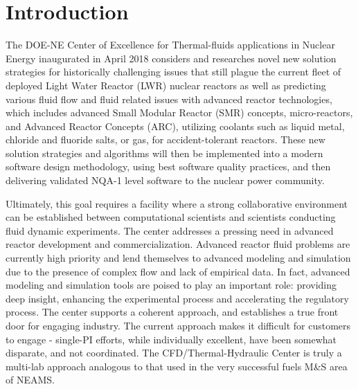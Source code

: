 \section{Introduction}
\label{s:intro}

The DOE-NE Center of Excellence for Thermal-fluids applications in Nuclear Energy inaugurated in April 2018 considers and researches novel new solution strategies for historically challenging issues that still plague the current fleet of deployed Light Water Reactor (LWR) nuclear reactors as well as predicting various fluid flow and fluid related issues with advanced reactor technologies, which includes advanced Small Modular Reactor (SMR) concepts, micro-reactors, and Advanced Reactor Concepts (ARC), utilizing coolants such as liquid metal, chloride and  fluoride salts, or gas, for accident-tolerant reactors. These new solution strategies and algorithms will then be implemented into a modern software design methodology, using best software quality practices, and then delivering validated NQA-1 level software to the nuclear power community.

Ultimately, this goal requires a facility where a strong collaborative environment can be established between computational scientists and scientists conducting fluid dynamic experiments. The center addresses a pressing need in advanced reactor development and commercialization. Advanced reactor fluid problems are currently high priority and lend themselves to advanced modeling and simulation due to the presence of complex flow and lack of empirical data. In fact, advanced modeling and simulation tools are poised to play an important role: providing deep insight, enhancing the experimental process and accelerating the regulatory process. The center supports a coherent approach, and establishes a true front door for engaging industry. The current approach makes it difficult for customers to engage - single-PI efforts, while individually excellent, have been somewhat disparate, and not coordinated. The CFD/Thermal-Hydraulic Center is truly a multi-lab approach analogous to that used in the very successful fuels M\&S area of NEAMS.

